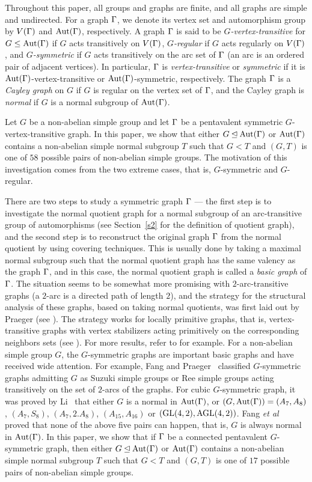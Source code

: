 \documentclass[12pt]{article}
\def\Aut{\hbox{\rm Aut}}
\begin{document}
Throughout this paper, all groups and graphs are finite, and all graphs are simple and undirected. For a graph $\Gamma$, we denote its vertex set and automorphism group by $V(\Gamma)$ and $\Aut(\G)$, respectively. A graph $\Gamma$ is said to be {\it $G$-vertex-transitive} for $G\leq \Aut(\Gamma)$ if $G$ acts transitively on $V(\Gamma)$, {\it $G$-regular} if $G$ acts regularly on $V(\Gamma)$, and {\it $G$-symmetric} if $G$ acts transitively on the arc set of $\Gamma$ (an arc is an ordered pair of adjacent vertices). In particular, $\Gamma$ is {\it vertex-transitive} or {\it symmetric} if it is $\Aut(\G)$-vertex-transitive or $\Aut(\G)$-symmetric, respectively. The graph $\Gamma$ is a {\em Cayley graph} on $G$ if $G$ is regular on the vertex set of
$\Gamma$, and the Cayley graph is \emph{normal} if $G$ is a normal subgroup of $\Aut(\G)$.

Let $G$ be a non-abelian simple group and let $\Gamma$ be a pentavalent symmetric $G$-vertex-transitive graph. In this paper, we show that either $G\unlhd \Aut(\G)$ or $\Aut(\G)$ contains a non-abelian simple normal subgroup $T$ such that $G<T$ and $(G,T)$ is one of $58$ possible pairs of non-abelian simple groups. The motivation of this investigation comes from the two extreme cases, that is, $G$-symmetric and $G$-regular.

There are two steps to study a symmetric graph $\Gamma$ --- the first step is to investigate the normal quotient graph for a normal subgroup of an arc-transitive group of automorphisms (see Section~\ref{s2} for the definition of quotient graph), and the second step is to reconstruct
the original graph $\Gamma$ from the normal quotient by using covering
techniques. This is usually done by taking a maximal normal subgroup such that the normal quotient graph has the same valency as the graph $\Gamma$, and in this case, the normal quotient graph is called a {\em basic graph} of $\Gamma$. The situation seems to be somewhat more promising with $2$-arc-transitive graphs (a $2$-arc is a directed path of length $2$), and the strategy for the structural analysis of these graphs, based on taking normal quotients, was first laid out by Praeger (see \cite{P1,P3}). The strategy works for locally primitive graphs, that is, vertex-transitive graphs with vertex stabilizers acting primitively on the corresponding neighbors sets (see \cite{P4,P5}). For more results, refer to \cite{FengLZ,LiLZ} for example. For a non-abelian simple group $G$, the $G$-symmetric graphs are important basic graphs and have received wide attention. For example, Fang and Praeger~\cite{FangP,FP2} classified $G$-symmetric graphs admitting $G$ as Suzuki simple groups or Ree simple groups acting transitively on the set of $2$-arcs of the graphs. For cubic $G$-symmetric graph, it was proved by Li~\cite{CHLi} that either $G$ is a normal in $\Aut(\G)$, or $(G,\Aut(\G))=(A_7,A_8)$, $(A_7,S_8)$, $(A_7,2.A_8)$, $(A_{15},A_{16})$ or $(\hbox{\rm GL}(4,2),\rm AGL(4,2))$. Fang {\em et al}~\cite{FangLW} proved that none of the above five pairs can happen, that is, $G$ is always normal in $\Aut(\G)$. In this paper, we show that if $\Gamma$ be a connected pentavalent $G$-symmetric graph, then either $G\unlhd \Aut(\G)$ or $\Aut(\G)$ contains a non-abelian simple normal subgroup $T$ such that $G<T$ and $(G,T)$ is one of $17$ possible pairs of non-abelian simple groups.
\end{document}
